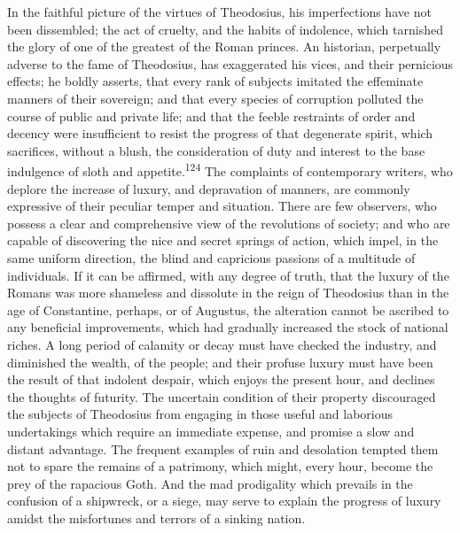 

In the faithful picture of the virtues of Theodosius, his
imperfections have not been dissembled; the act of cruelty, and
the habits of indolence, which tarnished the glory of one of the
greatest of the Roman princes. An historian, perpetually adverse
to the fame of Theodosius, has exaggerated his vices, and their
pernicious effects; he boldly asserts, that every rank of
subjects imitated the effeminate manners of their sovereign; and
that every species of corruption polluted the course of public
and private life; and that the feeble restraints of order and
decency were insufficient to resist the progress of that
degenerate spirit, which sacrifices, without a blush, the
consideration of duty and interest to the base indulgence of
sloth and appetite.\textsuperscript{124} The complaints of contemporary writers,
who deplore the increase of luxury, and depravation of manners,
are commonly expressive of their peculiar temper and situation.
There are few observers, who possess a clear and comprehensive
view of the revolutions of society; and who are capable of
discovering the nice and secret springs of action, which impel,
in the same uniform direction, the blind and capricious passions
of a multitude of individuals. If it can be affirmed, with any
degree of truth, that the luxury of the Romans was more shameless
and dissolute in the reign of Theodosius than in the age of
Constantine, perhaps, or of Augustus, the alteration cannot be
ascribed to any beneficial improvements, which had gradually
increased the stock of national riches. A long period of calamity
or decay must have checked the industry, and diminished the
wealth, of the people; and their profuse luxury must have been
the result of that indolent despair, which enjoys the present
hour, and declines the thoughts of futurity. The uncertain
condition of their property discouraged the subjects of
Theodosius from engaging in those useful and laborious
undertakings which require an immediate expense, and promise a
slow and distant advantage. The frequent examples of ruin and
desolation tempted them not to spare the remains of a patrimony,
which might, every hour, become the prey of the rapacious Goth.
And the mad prodigality which prevails in the confusion of a
shipwreck, or a siege, may serve to explain the progress of
luxury amidst the misfortunes and terrors of a sinking nation.

